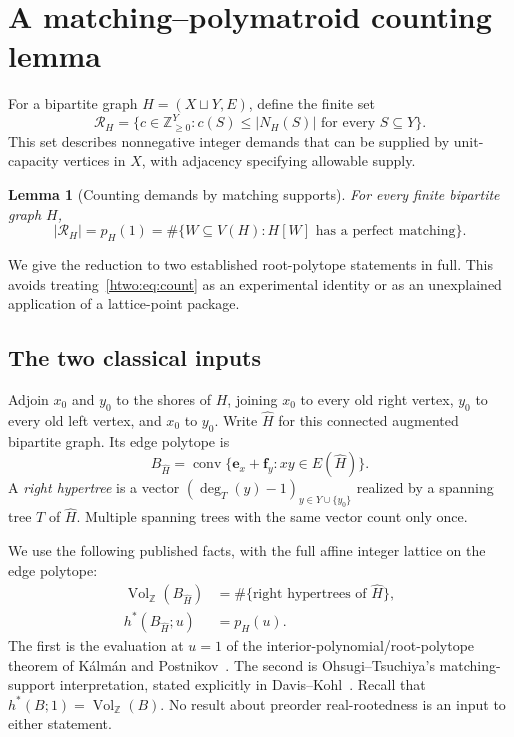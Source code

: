 \documentclass[11pt]{article}
\numberwithin{equation}{section}
\newtheorem{lemma}[theorem]{Lemma}
\theoremstyle{definition}
\newcommand{\Z}{\mathbb Z}
\newcommand{\N}{\mathbb Z_{\geq0}}
\newcommand{\conv}{\operatorname{conv}}
\newcommand{\Vol}{\operatorname{Vol}_{\Z}}
\newcommand{\ee}{\mathbf e}
\newcommand{\ff}{\mathbf f}
\begin{document}
\section{A matching--polymatroid counting lemma}\label{htwo:sec:count}

For a bipartite graph $H=(X\sqcup Y,E)$, define the finite set
\begin{equation}
 \mathcal R_H=\{c\in\N^Y:c(S)\le|N_H(S)|\text{ for every }S\subseteq Y\}.
 \label{htwo:eq:RH}
\end{equation}
This set describes nonnegative integer demands that can be supplied by
unit-capacity vertices in $X$, with adjacency specifying allowable supply.

\begin{lemma}[Counting demands by matching supports]\label{htwo:lem:count}
For every finite bipartite graph $H$,
\begin{equation}
 |\mathcal R_H|=p_H(1)
 =\#\{W\subseteq V(H):H[W]\text{ has a perfect matching}\}.\label{htwo:eq:count}
\end{equation}
\end{lemma}

We give the reduction to two established root-polytope statements in full.
This avoids treating~\eqref{htwo:eq:count} as an experimental identity or as an
unexplained application of a lattice-point package.

\subsection{The two classical inputs}

Adjoin $x_0$ and $y_0$ to the shores of $H$, joining $x_0$ to every old
right vertex, $y_0$ to every old left vertex, and $x_0$ to $y_0$. Write
$\widehat H$ for this connected augmented bipartite graph. Its edge polytope
is
\[
 B_{\widehat H}=\conv\{\ee_x+\ff_y:xy\in E(\widehat H)\}.
\]
A \emph{right hypertree} is a vector $(\deg_T(y)-1)_{y\in Y\cup\{y_0\}}$
realized by a spanning tree $T$ of $\widehat H$. Multiple spanning trees
with the same vector count only once.

We use the following published facts, with the full affine integer lattice
on the edge polytope:
\begin{align}
 \Vol(B_{\widehat H})
   &=\#\{\text{right hypertrees of }\widehat H\},\label{htwo:eq:KPinput}\\
 h^*(B_{\widehat H};u)&=p_H(u).\label{htwo:eq:OTinput}
\end{align}
The first is the evaluation at $u=1$ of the interior-polynomial/root-polytope
theorem of K\'alm\'an and Postnikov~\cite{KP}. The second is
Ohsugi--Tsuchiya's matching-support interpretation, stated explicitly in
Davis--Kohl~\cite[Theorem~3.10]{DK}. Recall that $h^*(B;1)=\Vol(B)$.
No result about preorder real-rootedness is an input to either statement.
\end{document}

